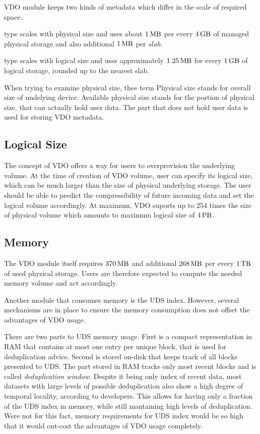 \documentclass[
  color, %
  table, %
  lof,   %
  lot,   %
]{fithesis3}
\begin{document}
VDO module keeps two kinds of metadata which differ in the scale of required space.
\begin{compactenum}
\item type scales with physical size and uses about $\SI{1}{\mega\byte}$ per every $\SI{4}{\giga\byte}$ of managed physical storage and also additional $\SI{1}{\mega\byte}$ per $slab$. 
\item type scales with logical size and uses approximately $\SI{1.25}{\mega\byte}$ for every $\SI{1}{\giga\byte}$ of logical storage, rounded up to the nearest slab.
\end{compactenum}

When trying to examine physical size, thee term Physical size stands for overall size of undelying device. Available physical size stands for the portion of physical size, that can actually hold user data. The part that does not hold user data is used for storing VDO metadata.

\subsection{Logical Size}
The concept of VDO offers a way for users to overprovision the underlying volume. At the time of creation of VDO volume, user can specify its logical size, which can be much larger than the size of physical underlying storage. The user should be able to predict the compressibility of future incoming data and set the logical volume accordingly. At maximum, VDO suports up to 254 times the size of physical volume which amounts to maximum logical size of $\SI{4}{\peta\byte}$.

\subsection{Memory}
The VDO module itself requires $\SI{370}{\mega\byte}$ and additional $\SI{268}{\mega\byte}$ per every $\SI{1}{\tera\byte}$ of used physical storage. Users are therefore expected to compute the needed memory volume and act accordingly.

Another module that consumes memory is the UDS index. However, several mechanisms are in place to ensure the memory consumption does not offset the advantages of VDO usage.

There are two parts to UDS memory usage. First is a compact representation in RAM that contains at most one entry per unique block, that is used for deduplication advice. Second is stored on-disk that keeps track of all blocks presented to UDS. The part stored in RAM tracks only most recent blocks and is called \emph{deduplication window}. Despite it being only index of recent data, most datasets with large levels of possible deduplication also show a high degree of temporal locality, according to developers. This allows for having only a fraction of the UDS index in memory, while still mantaining high levels of deduplication. Were not for this fact, memory requirements for UDS index would be so high that it would out-cost the advantages of VDO usage completely.
\end{document}
